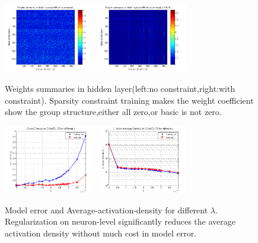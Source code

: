 \begin{figure}
\includegraphics[width=4cm,height=3cm]{figure/Weights_summaries_in_hidden_laye_swell_exp}
\includegraphics[width=4cm,height=3cm]{figure/Weights_summaries_in_hidden_laye_swell_exp_sc_3dot5_e_neg_5}
\caption{Weights summaries in hidden layer(left:no constraint,right:with constraint). Sparsity constraint
training makes the weight coefficient show the group structure,either all zero,or basic is not zero.}
\end{figure}

\begin{figure}
\includegraphics[width=4cm,height=3cm]{figure/Cross_Entropy_on_SWellEx_S5_for_different_lambda}
\includegraphics[width=4cm,height=3cm]{figure/Hidden_Average_Density_on_SWellEx_S5_for_different_lambda}
\caption{Model error and Average-activation-density for different $\lambda $.  Regularization on neuron-level
significantly reduces the average activation density without much cost in model error.}
\end{figure}


